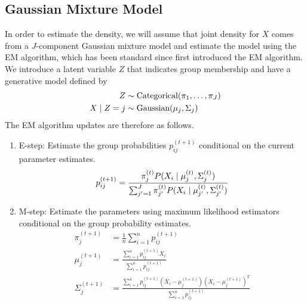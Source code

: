 \documentclass[12pt]{article}
\newcommand*{\cond}{\;\ifnum\currentgrouptype=16 \middle\fi|\;}
\newcommand*{\dist}{\sim}
\newcommand*{\mt}[1]{\text{\normalfont #1}}
\theoremstyle{definition}
\theoremstyle{algodesc}
\begin{document}
\subsection{Gaussian Mixture Model} \label{sec:gmm}
In order to estimate the density, we will assume that joint density for $X$ comes from a $J$-component Gaussian mixture model and estimate the model using the EM algorithm, which has been standard since \citet{dempsterlairdrubin77} first introduced the EM algorithm. We introduce a latent variable $Z$ that indicates group membership and have a generative model defined by
\begin{equation} \label{eq:gmm}
\begin{aligned}
Z &\dist \mt{Categorical}(\pi_1, \dots, \pi_J) \\
X \cond Z = j &\dist \mt{Gaussian}(\mu_j, \Sigma_j)
\end{aligned}
\end{equation}
The EM algorithm updates are therefore as follows.
\begin{enumerate}
\item
  E-step: Estimate the group probabilities $p_{ij}^{(t+1)}$ conditional on the current parameter estimates.
  \begin{equation} \label{eq:gmm_estep}
  p_{ij}^{(t+1)} = \frac{\pi_j^{(t)} P( X_i \cond \mu_j^{(t)}, \Sigma_j^{(t)})}{\sum_{j'=1}^J \pi_{j'}^{(t)} P( X_i \cond \mu_{j'}^{(t)}, \Sigma_{j'}^{(t)})}
  \end{equation}

\item
  M-step: Estimate the parameters using maximum likelihood estimators conditional on the group probability estimates.
  \begin{equation} \label{eq:gmm_mstep}
  \begin{aligned}
  \pi_j^{(t+1)} &= \frac{1}{n} \sum_{i=1}^n p_{ij}^{(t+1)} \\
  \mu_j^{(t+1)} &= \frac{\sum_{i=1}^n p_{ij}^{(t+1)} X_i}{\sum_{i=1}^n p_{ij}^{(t+1)}} \\
  \Sigma_j^{(t+1)} &= \frac{\sum_{i=1}^n p_{ij}^{(t+1)} (X_i - \mu_j^{(t+1)}) (X_i - \mu_j^{(t+1)})^T}{\sum_{i=1}^n p_{ij}^{(t+1)}}
  \end{aligned}
  \end{equation}
\end{enumerate}
\end{document}
